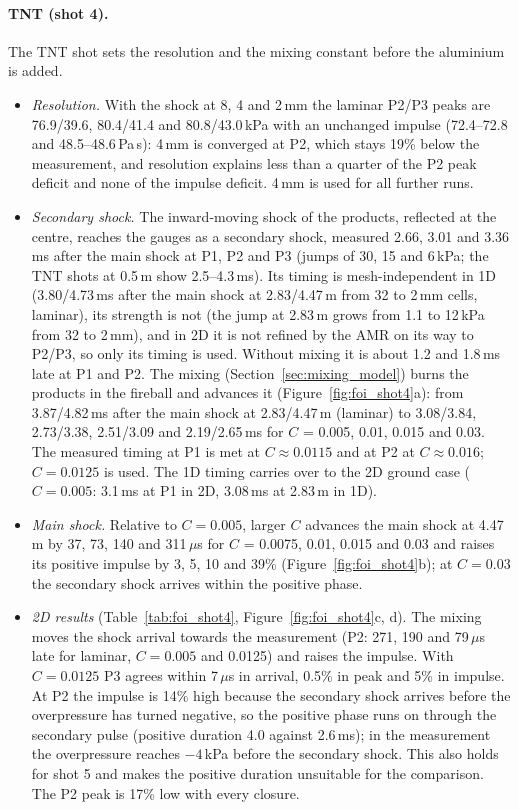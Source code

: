 \documentclass{article}
\begin{document}
\paragraph{TNT (shot 4).} The TNT shot sets the resolution and the mixing constant before the aluminium is added.
\begin{itemize}
    \item \emph{Resolution.} With the shock at 8, 4 and 2\,mm the laminar P2/P3 peaks are 76.9/39.6, 80.4/41.4 and 80.8/43.0\,kPa with an unchanged impulse (72.4--72.8 and 48.5--48.6\,Pa\,s): 4\,mm is converged at P2, which stays 19\% below the measurement, and resolution explains less than a quarter of the P2 peak deficit and none of the impulse deficit. 4\,mm is used for all further runs.
    \item \emph{Secondary shock.} The inward-moving shock of the products, reflected at the centre, reaches the gauges as a secondary shock, measured 2.66, 3.01 and 3.36\,ms after the main shock at P1, P2 and P3 (jumps of 30, 15 and 6\,kPa; the TNT shots at 0.5\,m show 2.5--4.3\,ms). Its timing is mesh-independent in 1D (3.80/4.73\,ms after the main shock at 2.83/4.47\,m from 32 to 2\,mm cells, laminar), its strength is not (the jump at 2.83\,m grows from 1.1 to 12\,kPa from 32 to 2\,mm), and in 2D it is not refined by the AMR on its way to P2/P3, so only its timing is used. Without mixing it is about 1.2 and 1.8\,ms late at P1 and P2. The mixing (Section~\ref{sec:mixing_model}) burns the products in the fireball and advances it (Figure~\ref{fig:foi_shot4}a): from 3.87/4.82\,ms after the main shock at 2.83/4.47\,m (laminar) to 3.08/3.84, 2.73/3.38, 2.51/3.09 and 2.19/2.65\,ms for $C$ = 0.005, 0.01, 0.015 and 0.03. The measured timing at P1 is met at $C \approx 0.0115$ and at P2 at $C \approx 0.016$; $C = 0.0125$ is used. The 1D timing carries over to the 2D ground case ($C = 0.005$: 3.1\,ms at P1 in 2D, 3.08\,ms at 2.83\,m in 1D).
    \item \emph{Main shock.} Relative to $C = 0.005$, larger $C$ advances the main shock at 4.47\,m by 37, 73, 140 and 311\,$\mu$s for $C$ = 0.0075, 0.01, 0.015 and 0.03 and raises its positive impulse by 3, 5, 10 and 39\% (Figure~\ref{fig:foi_shot4}b); at $C = 0.03$ the secondary shock arrives within the positive phase.
    \item \emph{2D results} (Table~\ref{tab:foi_shot4}, Figure~\ref{fig:foi_shot4}c, d). The mixing moves the shock arrival towards the measurement (P2: 271, 190 and 79\,$\mu$s late for laminar, $C = 0.005$ and 0.0125) and raises the impulse. With $C = 0.0125$ P3 agrees within 7\,$\mu$s in arrival, 0.5\% in peak and 5\% in impulse. At P2 the impulse is 14\% high because the secondary shock arrives before the overpressure has turned negative, so the positive phase runs on through the secondary pulse (positive duration 4.0 against 2.6\,ms); in the measurement the overpressure reaches $-4$\,kPa before the secondary shock. This also holds for shot 5 and makes the positive duration unsuitable for the comparison. The P2 peak is 17\% low with every closure.
\end{itemize}
\end{document}
